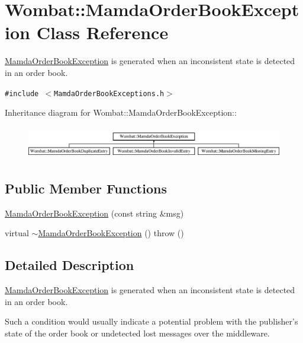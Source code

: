 \hypertarget{classWombat_1_1MamdaOrderBookException}{
\section{Wombat::Mamda\-Order\-Book\-Exception Class Reference}
\label{classWombat_1_1MamdaOrderBookException}
}
\hyperlink{classWombat_1_1MamdaOrderBookException}{Mamda\-Order\-Book\-Exception} is generated when an inconsistent state is detected in an order book.  


{\tt \#include $<$Mamda\-Order\-Book\-Exceptions.h$>$}

Inheritance diagram for Wombat::Mamda\-Order\-Book\-Exception::\begin{figure}[H]
\begin{center}
\leavevmode
\includegraphics[height=1.45833cm]{classWombat_1_1MamdaOrderBookException}
\end{center}
\end{figure}
\subsection*{Public Member Functions}
\begin{CompactItemize}
\item 
\hyperlink{classWombat_1_1MamdaOrderBookException_3448ed4fc1a4399facdc87029fa762e3}{Mamda\-Order\-Book\-Exception} (const string \&msg)
\item 
virtual \hyperlink{classWombat_1_1MamdaOrderBookException_c3de29a446484d7b45c1ebc58e87df30}{$\sim$Mamda\-Order\-Book\-Exception} ()  throw ()
\end{CompactItemize}


\subsection{Detailed Description}
\hyperlink{classWombat_1_1MamdaOrderBookException}{Mamda\-Order\-Book\-Exception} is generated when an inconsistent state is detected in an order book. 

Such a condition would usually indicate a potential problem with the publisher's state of the order book or undetected lost messages over the middleware. 



